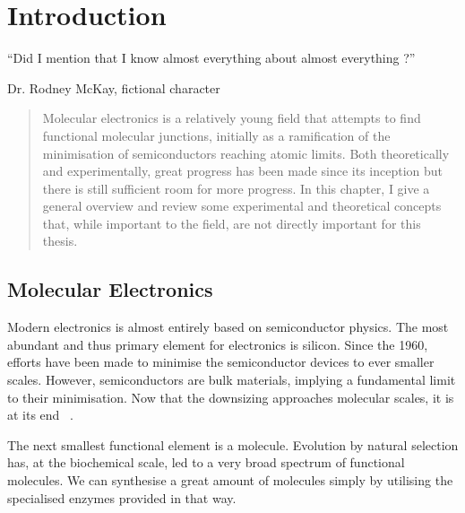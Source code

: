 \chapter{Introduction}
\label{ch:chapter_1}



\epigraph{
    “Did I mention that I know almost everything about almost everything ?”
}{Dr. Rodney McKay, fictional character}

\begin{abstract}
Molecular electronics is a relatively young field that attempts to find functional molecular junctions, initially as a ramification of the minimisation of semiconductors reaching atomic limits. Both theoretically and experimentally, great progress has been made since its inception but there is still sufficient room for more progress. In this chapter, I give a general overview and review some experimental and theoretical concepts that, while important to the field, are not directly important for this thesis.
\end{abstract}

\newpage
\section{Molecular Electronics}
Modern electronics is almost entirely based on semiconductor physics. The most abundant and thus primary element for electronics is silicon. Since the 1960, efforts have been made to minimise the semiconductor devices to ever smaller scales. However, semiconductors are bulk materials, implying a fundamental limit to their minimisation. Now that the downsizing approaches molecular scales, it is at its end ~\cite{seldenthuis}.

The next smallest functional element is a molecule. Evolution by natural selection has, at the biochemical scale, led to a very broad spectrum of functional molecules. We can synthesise a great amount of molecules simply by utilising the specialised enzymes provided in that way.

